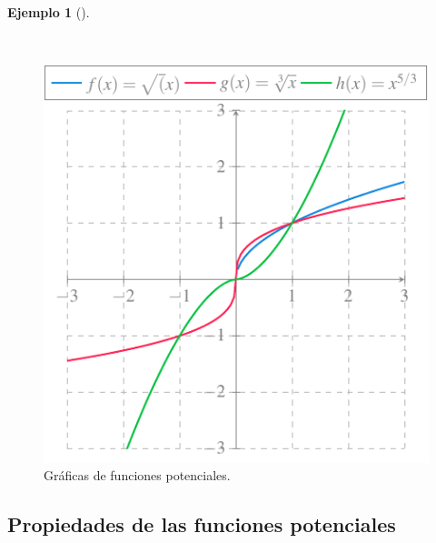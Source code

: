 \documentclass[
  a4paper,
]{scrreport}
\theoremstyle{definition}
\newtheorem{example}{Ejemplo}[chapter]
\theoremstyle{plain}
\theoremstyle{definition}
\theoremstyle{definition}
\theoremstyle{plain}
\theoremstyle{plain}
\theoremstyle{remark}
\begin{document}
\begin{example}[]\protect\hypertarget{exm-funcion-potencial}{}\label{exm-funcion-potencial}

~

\begin{figure}[H]

{\centering \includegraphics{./img/funciones/funcion-potencial.pdf}

}

\caption{Gráficas de funciones potenciales.}

\end{figure}%

\end{example}

\subsection{Propiedades de las funciones
potenciales}\label{propiedades-de-las-funciones-potenciales}
\end{document}
